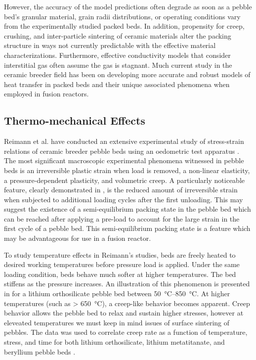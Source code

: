 \documentclass[11pt]{report} %
\begin{document}
However, the accuracy of the model predictions often degrade as soon as a pebble bed's granular material, grain radii distributions, or operating conditions vary from the experimentally studied packed beds. In addition, propensity for creep, crushing, and inter-particle sintering of ceramic materials alter the packing structure in ways not currently predictable with the effective material characterizations. Furthermore, effective conductivity models that consider interstitial gas often assume the gas is stagnant. Much current study in the ceramic breeder field has been on developing more accurate and robust models of heat transfer in packed beds and their unique associated phenomena when employed in fusion reactors.

\subsection{Thermo-mechanical Effects}
Reimann et al. have conducted an extensive experimental study of stress-strain relations of ceramic breeder pebble beds using an oedometric test apparatus \cite{Piazza2002811,Reimann:2002kl,Reimann:2003qc,Reimann:2002mi,Reimann:2001il}. The most significant macroscopic experimental phenomena witnessed in pebble beds is an irreversible plastic strain when load is removed, a non-linear elasticity, a pressure-dependent plasticity, and volumetric creep.  A particularly noticeable feature, clearly demonstrated in , is the reduced amount of irreversible strain when subjected to additional loading cycles after the first unloading. This may suggest the existence of a semi-equilibrium packing state in the pebble bed which can be reached after applying a pre-load to account for the large strain in the first cycle of a pebble bed. This semi-equilibrium packing state is a feature which may be advantageous for use in a fusion reactor.

To study temperature effects in Reimann's studies, beds are freely heated to desired working temperatures before pressure load is applied. Under the same loading condition, beds behave much softer at higher temperatures. The bed stiffens as the pressure increases. An illustration of this phenomenon is presented in  for a lithium orthosilicate pebble bed between \SIrange{50}{850}{\celsius}. At higher temperatures (such as > \SI{650}{\celsius}), a creep-like behavior becomes apparent. Creep behavior allows the pebble bed to relax and sustain higher stresses, however at eleveated temperatures we must keep in mind issues of surface sintering of pebbles. The data was used to correlate creep rate as a function of temperature, stress, and time for both lithium orthosilicate, lithium metatitanate, and beryllium pebble beds \cite{Buhler:2002qf,Reimann:2001il,Reimann2005}.
\end{document}

